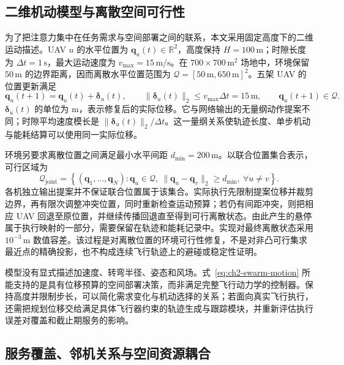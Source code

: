 \subsection{二维机动模型与离散空间可行性}
\label{sec:ch2-swarm-kinematics}

为了把注意力集中在任务需求与空间部署之间的联系，本文采用固定高度下的二维运动描述。UAV $u$ 的水平位置为 $\mathbf q_u(t)\in\mathbb R^2$，高度保持 $H=100\,\mathrm{m}$；时隙长度为 $\Delta t=1\,\mathrm{s}$，最大运动速度为 $v_{\max}=15\,\mathrm{m/s}$。在 $700\times700\,\mathrm{m}^2$ 场地中，环境保留 $50\,\mathrm{m}$ 的边界距离，因而离散水平位置范围为 $\mathcal Q=[50\,\mathrm{m},650\,\mathrm{m}]^2$。五架 UAV 的位置更新满足
\begin{equation}
    \mathbf q_u(t+1)=\mathbf q_u(t)+\boldsymbol\delta_u(t),\qquad
    \|\boldsymbol\delta_u(t)\|_2\leq v_{\max}\Delta t=15\,\mathrm{m},\qquad
    \mathbf q_u(t+1)\in\mathcal Q.
    \label{eq:ch2-swarm-motion}
\end{equation}
$\boldsymbol\delta_u(t)$ 的单位为 m，表示修复后的实际位移。它与网络输出的无量纲动作提案不同；时隙平均速度模长是 $\|\boldsymbol\delta_u(t)\|_2/\Delta t$。这一量纲关系使轨迹长度、单步机动与能耗结算可以使用同一实际位移。

环境另要求离散位置之间满足最小水平间距 $d_{\min}=200\,\mathrm{m}$。以联合位置集合表示，可行区域为
\begin{equation}
    \mathcal Q_{\mathrm{joint}}=
    \left\{(\mathbf q_1,\ldots,\mathbf q_N):\mathbf q_u\in\mathcal Q,
    \ \|\mathbf q_u-\mathbf q_v\|_2\geq d_{\min},\ \forall u\neq v\right\}.
    \label{eq:ch2-joint-geometry}
\end{equation}
各机独立输出提案并不保证联合位置属于该集合。实际执行先限制提案位移并裁剪边界，再有限次调整冲突位置，同时重新检查运动预算；若仍有间距冲突，则把相应 UAV 回退至原位置，并继续传播回退直至得到可行离散状态。由此产生的悬停属于执行映射的一部分，需要保留在轨迹和能耗记录中。实现对最终离散状态采用 $10^{-3}\,\mathrm{m}$ 数值容差。该过程是对离散位置的环境可行性修复，不是对非凸可行集求最近点的精确投影，也不构成连续飞行轨迹上的避碰或稳定性证明。

模型没有显式描述加速度、转弯半径、姿态和风场。式~\eqref{eq:ch2-swarm-motion} 所能支持的是具有位移预算的空间部署决策，而非满足完整飞行动力学的控制器。保持高度并限制步长，可以简化需求变化与机动选择的关系；若面向真实飞行执行，还需把规划位移交给满足具体飞行器约束的轨迹生成与跟踪模块，并重新评估执行误差对覆盖和截止期服务的影响。

\subsection{服务覆盖、邻机关系与空间资源耦合}
\label{sec:ch2-spatial-resource-coupling}

